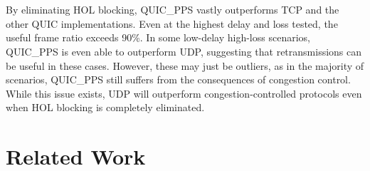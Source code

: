 \documentclass{mpaper}
\begin{document}
\\\\
By eliminating HOL blocking, QUIC\_PPS vastly outperforms TCP and the other QUIC implementations. Even at the highest delay and loss tested, the useful frame ratio exceeds 90\%. In some low-delay high-loss scenarios, \newline QUIC\_PPS is even able to outperform UDP, suggesting that retransmissions can be useful in these cases. However, these may just be outliers, as in the majority of scenarios, \newline QUIC\_PPS still suffers from the consequences of congestion control. While this issue exists, UDP will outperform congestion-controlled protocols even when HOL blocking is completely eliminated.

\section{Related Work} \label{Related Work}
\end{document}

